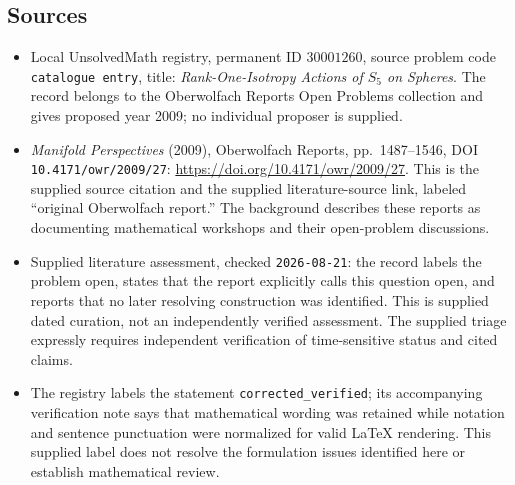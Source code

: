 \documentclass[11pt]{article}
\begin{document}
\subsection{Sources}
\begin{itemize}
\item Local UnsolvedMath registry, permanent ID \(30001260\), source problem code \texttt{catalogue entry}, title: \emph{Rank-One-Isotropy Actions of \(S_5\) on Spheres}. The record belongs to the Oberwolfach Reports Open Problems collection and gives proposed year 2009; no individual proposer is supplied.
\item \emph{Manifold Perspectives} (2009), Oberwolfach Reports, pp.\ 1487--1546, DOI \texttt{10.4171/owr/2009/27}: \url{https://doi.org/10.4171/owr/2009/27}. This is the supplied source citation and the supplied literature-source link, labeled ``original Oberwolfach report.'' The background describes these reports as documenting mathematical workshops and their open-problem discussions.
\item Supplied literature assessment, checked \texttt{2026-08-21}: the record labels the problem open, states that the report explicitly calls this question open, and reports that no later resolving construction was identified. This is supplied dated curation, not an independently verified assessment. The supplied triage expressly requires independent verification of time-sensitive status and cited claims.
\item The registry labels the statement \texttt{corrected\_verified}; its accompanying verification note says that mathematical wording was retained while notation and sentence punctuation were normalized for valid LaTeX rendering. This supplied label does not resolve the formulation issues identified here or establish mathematical review.
\end{itemize}
\end{document}
